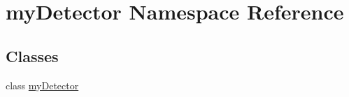 \hypertarget{namespacemy_detector}{\section{my\-Detector Namespace Reference}
\label{namespacemy_detector}
}
\subsection*{Classes}
\begin{DoxyCompactItemize}
\item 
class \hyperlink{classmy_detector_1_1my_detector}{my\-Detector}
\end{DoxyCompactItemize}
